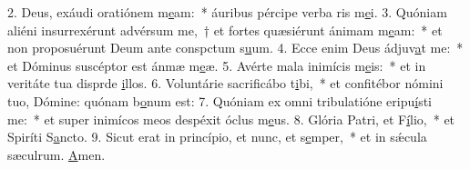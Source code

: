2. Deus, exáudi oratiónem m\uline{e}am:~* áuribus pércipe verba ris m\uline{e}i.
3. Quóniam aliéni insurrexérunt advérsum me,~† et fortes quæsiérunt ánimam m\uline{e}am:~* et non proposuérunt Deum ante conspctum s\uline{u}um.
4. Ecce enim Deus ádjuv\uline{a}t me:~* et Dóminus suscéptor est ánmæ m\uline{e}æ.
5. Avérte mala inimícis m\uline{e}is:~* et in veritáte tua disprde \uline{i}llos.
6. Voluntárie sacrificábo t\uline{i}bi,~* et confitébor nómini tuo, Dómine: quónam b\uline{o}num est:
7. Quóniam ex omni tribulatióne eripu\uline{í}sti me:~* et super inimícos meos despéxit óclus m\uline{e}us.
8. Glória Patri, et F\uline{í}lio,~* et Spiríti S\uline{a}ncto.
9. Sicut erat in princípio, et nunc, et s\uline{e}mper,~* et in sǽcula sæculrum. \uline{A}men.
